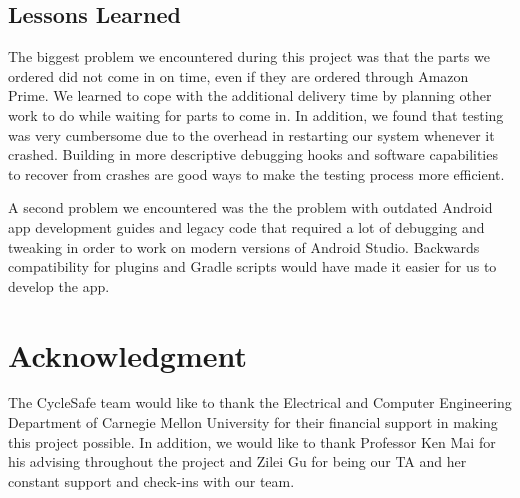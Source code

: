 \documentclass[journal]{IEEEtran}
\begin{document}
\subsection{Lessons Learned}
The biggest problem we encountered during this project was that the parts we ordered did not come in on time, even if they are ordered through Amazon Prime. We learned to cope with the additional delivery time by planning other work to do while waiting for parts to come in. In addition, we found that testing was very cumbersome due to the overhead in restarting our system whenever it crashed. Building in more descriptive debugging hooks and software capabilities to recover from crashes are good ways to make the testing process more efficient.

A second problem we encountered was the the problem with outdated Android app development guides and legacy code that required a lot of debugging and tweaking in order to work on modern versions of Android Studio. Backwards compatibility for plugins and Gradle scripts would have made it easier for us to develop the app.

\section*{Acknowledgment}
The CycleSafe team would like to thank the Electrical and Computer Engineering Department of Carnegie Mellon University for their financial support in making this project possible. In addition, we would like to thank Professor Ken Mai for his advising throughout the project
and Zilei Gu for being our TA and her constant support and check-ins with our team.






\clearpage

\end{document}
